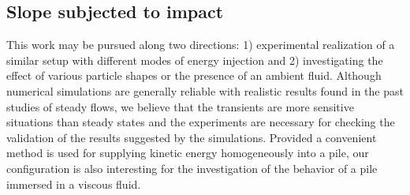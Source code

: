 \subsection{Slope subjected to impact}
This work may be pursued along two directions: 1) experimental realization of a 
similar setup with different modes of energy injection and 2) investigating the 
effect of various particle shapes or the presence of an ambient fluid. Although 
numerical simulations are generally reliable with realistic results found in 
the past studies of steady flows, we believe that the transients are more 
sensitive situations than steady states and the  experiments are necessary for 
checking the validation of the results suggested by the simulations. Provided a 
convenient method is used for supplying kinetic energy homogeneously into a 
pile, our configuration is also interesting for the investigation of the 
behavior of a pile immersed in a viscous fluid.